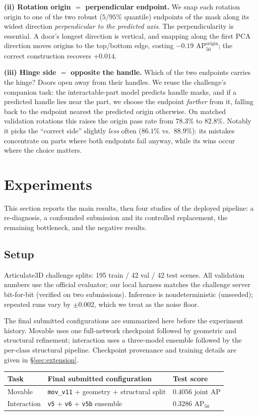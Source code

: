 \documentclass[11pt]{article}
\begin{document}
\textbf{(ii) Rotation origin $=$ perpendicular endpoint.} We snap each
rotation origin to one of the two robust ($5/95\%$ quantile) endpoints of the
mask along its widest direction \emph{perpendicular to the predicted axis}.
The perpendicularity is essential. A door's longest direction is vertical,
and snapping along the first PCA direction moves origins to the top/bottom
edge, costing $-0.19$ AP$_{50}^{\text{origin}}$; the correct construction
recovers $+0.014$.

\textbf{(iii) Hinge side $=$ opposite the handle.} Which of the two endpoints
carries the hinge? Doors open away from their handles. We reuse the
challenge's companion task: the interactable-part model predicts handle
masks, and if a predicted handle lies near the part, we choose the endpoint
\emph{farther} from it, falling back to the endpoint nearest the predicted
origin otherwise. On matched validation rotations this raises the origin
pass rate from $78.3\%$ to $82.8\%$. Notably it picks the ``correct side''
slightly \emph{less} often ($86.1\%$ vs.\ $88.9\%$): its mistakes
concentrate on parts where both endpoints fail anyway, while its wins occur
where the choice matters.

\section{Experiments}

This section reports the main results, then four studies of the deployed
pipeline: a re-diagnosis, a confounded submission and its controlled
replacement, the remaining bottleneck, and the negative results.

\subsection{Setup}
Articulate3D challenge splits: 195 train / 42 val / 42 test scenes.
All validation numbers use the official evaluator; our local harness matches
the challenge server bit-for-bit (verified on two submissions). Inference is
nondeterministic (unseeded); repeated runs vary by $\pm 0.002$, which we
treat as the noise floor.

The final submitted configurations are summarized here before the experiment
history. Movable uses one full-network checkpoint followed by geometric and
structural refinement; interaction uses a three-model ensemble followed by
the per-class structural pipeline. Checkpoint provenance and training details
are given in \S\ref{sec:extension}.
\begin{center}
\small
\begin{tabular}{@{}lll@{}}
\toprule
Task & Final submitted configuration & Test score \\
\midrule
Movable & \texttt{mov\_v11} + geometry + structural split & $0.4056$ joint AP \\
Interaction & \texttt{v5} + \texttt{v6} + \texttt{v5b} ensemble & $0.3286$ AP$_{50}$ \\
\bottomrule
\end{tabular}
\end{center}
\end{document}
